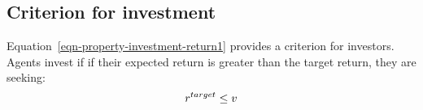 \subsection{Criterion for investment}
Equation~\ref{eqn-property-investment-return1} provides a criterion for investors. Agents invest if if their expected return is greater than the target return, they are seeking:
\begin{equation}\Large
r^{target}\le v 
\label{eqn-property-investment-return2}
\end{equation}






